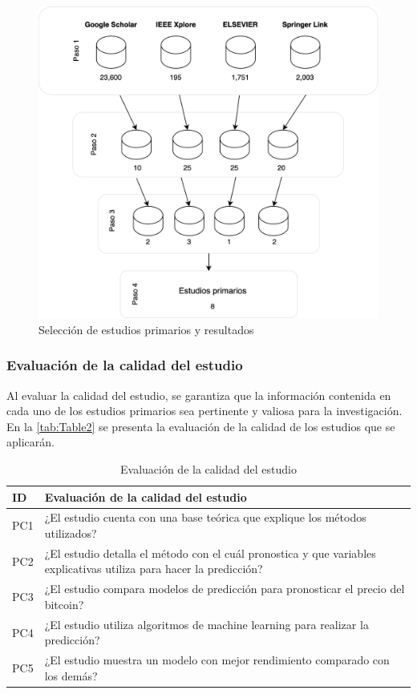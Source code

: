 \begin{figure}[!h]
	\centering
	\includegraphics[width=0.7\linewidth]{Chapter2/SelecEstudiPrim_1.png}
	\caption{Selección de estudios primarios y resultados}
	\label{fig1}
\end{figure}

\vspace{-0.5cm}

\subsubsection{Evaluación de la calidad del estudio}
Al evaluar la calidad del estudio, se garantiza que la información contenida en cada uno de los estudios primarios sea pertinente y valiosa para la investigación. En la \autoref{tab:Table2} se presenta la evaluación de la calidad de los estudios que se aplicarán.

\begin{table}[!h]
	\centering
	\begin{tabular}{ | m{2cm}| m{12cm} | }
		\hline
		\textbf{ID} & \textbf{Evaluación de la calidad del estudio}\\
		\hline
		PC1 & ¿El estudio cuenta con una base teórica que explique los métodos utilizados?\\
		\hline
		PC2 & ¿El estudio detalla el método con el cuál pronostica y que variables explicativas utiliza para hacer la predicción?\\
		\hline
		PC3 & ¿El estudio compara modelos de predicción para pronosticar el precio del bitcoin?\\
		\hline
		PC4 & ¿El estudio utiliza algoritmos de machine learning para realizar la predicción?\\
		\hline
		PC5 & ¿El estudio muestra un modelo con mejor rendimiento comparado con los demás?\\
		\hline
	\end{tabular}
	\caption{Evaluación de la calidad del estudio}
	\label{tab:Table2}
\end{table}

